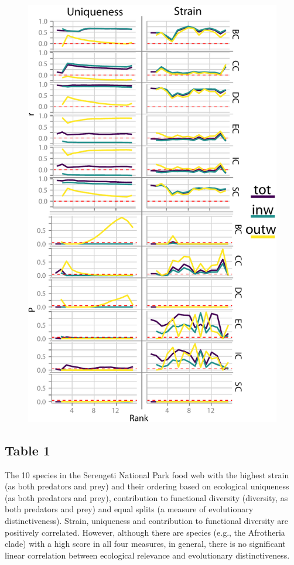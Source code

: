 \documentclass[12pt]{article}
\begin{document}
\begin{figure}[h!]
 \centering
 \includegraphics[height=0.6\textheight]{./Images/Figure_4.pdf}
\end{figure}
\newpage

\subsection*{Table 1}

The 10 species in the Serengeti National Park food web
\citep{baskerville2011spatial} with the highest strain (as both predators and prey)
and their ordering based on ecological uniqueness  (as both predators and
prey), contribution to functional diversity (diversity, as both predators and
prey) and equal splits (a measure of evolutionary distinctiveness). Strain,
uniqueness and contribution to functional diversity are positively correlated.
However, although there are species (e.g., the Afrotheria clade) with a high
score in all four measures, in general, there is no significant linear correlation between
ecological relevance and evolutionary distinctiveness.\newline
\end{document}
